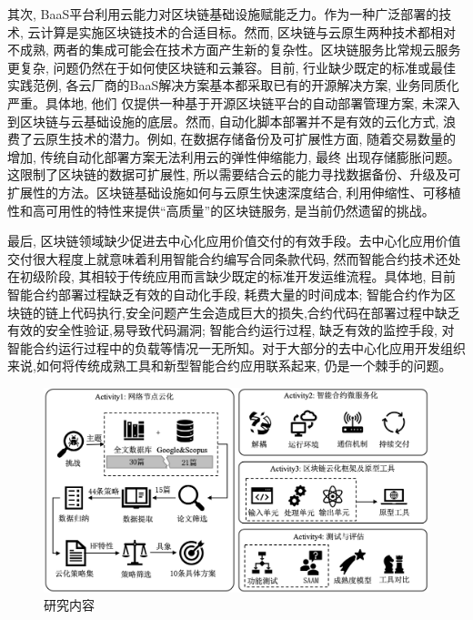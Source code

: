 其次, BaaS平台利用云能力对区块链基础设施赋能乏力。作为一种广泛部署的技术, 云计算是实施区块链技术的合适目标。然而, 区块链与云原生两种技术都相对不成熟, 两者的集成可能会在技术方面产生新的复杂性\cite{onik2019performance}。区块链服务比常规云服务更复杂, 问题仍然在于如何使区块链和云兼容\cite{gai2020blockchain}。目前, 行业缺少既定的标准或最佳实践范例, 各云厂商的BaaS解决方案基本都采取已有的开源解决方案, 业务同质化严重。具体地, 他们 仅提供一种基于开源区块链平台的自动部署管理方案, 未深入到区块链与云基础设施的底层。然而, 自动化脚本部署并不是有效的云化方式, 浪费了云原生技术的潜力。例如, 在数据存储备份及可扩展性方面, 随着交易数量的增加, 传统自动化部署方案无法利用云的弹性伸缩能力, 最终 出现存储膨胀问题。这限制了区块链的数据可扩展性, 所以需要结合云的能力寻找数据备份、升级及可扩展性的方法。区块链基础设施如何与云原生快速深度结合, 利用伸缩性、可移植性和高可用性的特性来提供“高质量”的区块链服务, 是当前仍然遗留的挑战。

最后, 区块链领域缺少促进去中心化应用价值交付的有效手段。去中心化应用价值交付很大程度上就意味着利用智能合约编写合同条款代码, 然而智能合约技术还处在初级阶段, 其相较于传统应用而言缺少既定的标准开发运维流程。具体地, 目前智能合约部署过程缺乏有效的自动化手段, 耗费大量的时间成本; 智能合约作为区块链的链上代码执行,安全问题产生会造成巨大的损失,合约代码在部署过程中缺乏有效的安全性验证,易导致代码漏洞; 智能合约运行过程, 缺乏有效的监控手段, 对智能合约运行过程中的负载等情况一无所知。对于大部分的去中心化应用开发组织来说,如何将传统成熟工具和新型智能合约应用联系起来, 仍是一个棘手的问题。

\begin{figure}[h] %
    \centering %
    \includegraphics[width=1.0\textwidth]{FIGs/chapter1/process.png} %
    \caption{研究内容} %
    \label{framework_tool} %
\end{figure}%


